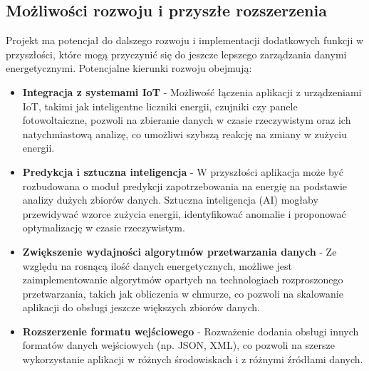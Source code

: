\subsection{Możliwości rozwoju i przyszłe rozszerzenia}
Projekt ma potencjał do dalszego rozwoju i implementacji dodatkowych funkcji w przyszłości, które mogą przyczynić się do jeszcze lepszego zarządzania danymi energetycznymi. Potencjalne kierunki rozwoju obejmują:
\begin{itemize}
\item\textbf{Integracja z systemami IoT} - Możliwość łączenia aplikacji z urządzeniami IoT, takimi jak inteligentne liczniki energii, czujniki czy panele fotowoltaiczne, pozwoli na zbieranie danych w czasie rzeczywistym oraz ich natychmiastową analizę, co umożliwi szybszą reakcję na zmiany w zużyciu energii.
\item\textbf{Predykcja i sztuczna inteligencja} - W przyszłości aplikacja może być rozbudowana o moduł predykcji zapotrzebowania na energię na podstawie analizy dużych zbiorów danych. Sztuczna inteligencja (AI) mogłaby przewidywać wzorce zużycia energii, identyfikować anomalie i proponować optymalizację w czasie rzeczywistym.
\item\textbf{Zwiększenie wydajności algorytmów przetwarzania danych} - Ze względu na rosnącą ilość danych energetycznych, możliwe jest zaimplementowanie algorytmów opartych na technologiach rozproszonego przetwarzania, takich jak obliczenia w chmurze, co pozwoli na skalowanie aplikacji do obsługi jeszcze większych zbiorów danych.
\item\textbf{Rozszerzenie formatu wejściowego} - Rozważenie dodania obsługi innych formatów danych wejściowych (np. JSON, XML), co pozwoli na szersze wykorzystanie aplikacji w różnych środowiskach i z różnymi źródłami danych.
\end{itemize}
